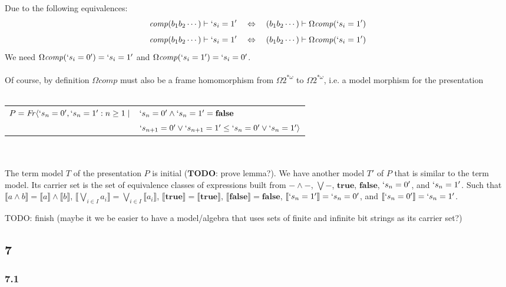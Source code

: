 \documentclass{article}
\newcommand{\mbf}{\mathbf}
\newcommand{\sem}[1]{\llbracket #1 \rrbracket}
\begin{document}
\newcommand{\comp}{\mathit{comp}}

Due to the following equivalences:
$$\mathit{comp}(b_1 b_2 \cdots) \vdash `s_i = 1'~~~\Leftrightarrow~~~(b_1 b_2 \cdots) \vdash \Omega \mathit{comp}(`s_i = 1')$$
$$\mathit{comp}(b_1 b_2 \cdots) \vdash `s_i = 1'~~~\Leftrightarrow~~~(b_1 b_2 \cdots) \vdash \Omega \mathit{comp}(`s_i = 1')$$
We need $\Omega \comp(`s_i = 0') = `s_i = 1'$ and $\Omega \comp(`s_i = 1') = `s_i = 0'$.\\~\\
Of course, by definition $\Omega \comp$ must also be a frame homomorphism from $\Omega 2^{*\omega}$ to $\Omega 2^{* \omega}$, i.e. a model morphism for the presentation\\~\\
\begin{tabular}{ll}
$P = \mathit{Fr} \langle `s_n = 0', `s_n = 1' : n \geq 1 \mid$ & $`s_n = 0' \wedge `s_n = 1' = \mbf{false}$ \\
 & $`s_{n+1} = 0' \vee `s_{n+1}=1' \leq `s_n = 0' \vee `s_n = 1' \rangle$\\
\end{tabular}\\~\\
The term model $T$ of the presentation $P$ is initial ($\mbf{TODO}$: prove lemma?). We have another model $T'$ of $P$ that is similar to the term model. Its carrier set is the set of equivalence classes of expressions built from $- \wedge -$, $\bigvee -$, $\mbf{true}$, $\mbf{false}$, $`s_n = 0'$, and $`s_n = 1'$. Such that $\sem{a \wedge b} = \sem{a} \wedge \sem{b}$, $\sem{\bigvee_{i \in I} a_i} = \bigvee_{i \in I} \sem{a_i}$, $\sem{\mbf{true}} = \sem{\mbf{true}}$, $\sem{\mbf{false}} = \mbf{false}$, $\sem{`s_n = 1'} = `s_n = 0'$, and $\sem{`s_n = 0'} = `s_n = 1'$.

TODO: finish (maybe it we be easier to have a model/algebra that uses sets of finite and infinite bit strings as its carrier set?)  

\subsection*{7}

\subsubsection*{7.1}
\end{document}

